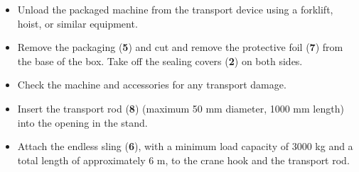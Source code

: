 \begin{itemize}
    \item Unload the packaged machine from the transport device using a forklift, hoist, or similar equipment.
    \item Remove the packaging (\textbf{5}) and cut and remove the protective foil (\textbf{7}) from the base of the box. Take off the sealing covers (\textbf{2}) on both sides.
    \item Check the machine and accessories for any transport damage.
\end{itemize}


\begin{itemize}
    \item Insert the transport rod (\textbf{8}) (maximum 50 mm diameter, 1000 mm length) into the opening in the stand.
    \item Attach the endless sling (\textbf{6}), with a minimum load capacity of 3000 kg and a total length of approximately 6 m, to the crane hook and the transport rod.
\end{itemize}

